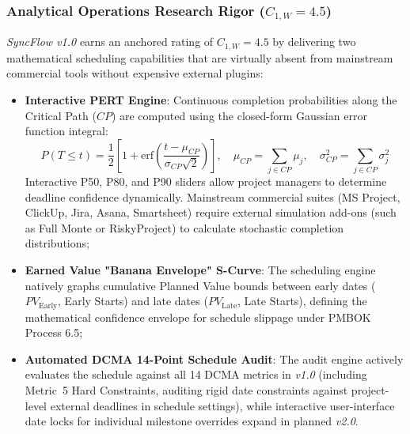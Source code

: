 \subsubsection{Analytical Operations Research Rigor ($C_{1,W} = 4.5$)}
\textit{SyncFlow v1.0} earns an anchored rating of $C_{1,W} = 4.5$ by delivering two mathematical scheduling capabilities that are virtually absent from mainstream commercial tools without expensive external plugins:
\begin{itemize}[itemsep=1pt,topsep=1pt]
    \item \textbf{Interactive PERT Engine}: Continuous completion probabilities along the Critical Path ($CP$) are computed using the closed-form Gaussian error function integral:
    \begin{equation*}
        P(T \le t) = \frac{1}{2}\left[1 + \text{erf}\left(\frac{t - \mu_{CP}}{\sigma_{CP}\sqrt{2}}\right)\right], \quad \mu_{CP} = \sum_{j \in CP} \mu_j, \quad \sigma_{CP}^2 = \sum_{j \in CP} \sigma_j^2
    \end{equation*}
    Interactive P50, P80, and P90 sliders allow project managers to determine deadline confidence dynamically. Mainstream commercial suites (MS Project, ClickUp, Jira, Asana, Smartsheet) require external simulation add-ons (such as Full Monte or Risky\-Project) to calculate stochastic completion distributions;
    \item \textbf{Earned Value "Banana Envelope" S-Curve}: The scheduling engine natively graphs cumulative Planned Value bounds between early dates ($PV_{\text{Early}}$, Early Starts) and late dates ($PV_{\text{Late}}$, Late Starts), defining the mathematical confidence envelope for schedule slippage under PMBOK Process 6.5;
    \item \textbf{Automated DCMA 14-Point Schedule Audit}: The audit engine actively evaluates the schedule against all 14 DCMA metrics in \textit{v1.0} (including Metric~5 Hard Constraints, auditing rigid date constraints against project-level external deadlines in schedule settings), while interactive user-interface date locks for individual milestone overrides expand in planned \textit{v2.0}.
\end{itemize}

